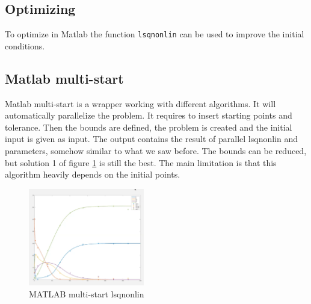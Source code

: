   \subsection{Optimizing}
  To optimize in Matlab the function \texttt{lsqnonlin} can be used to improve the initial conditions.

  \subsection{Matlab multi-start}
  Matlab multi-start is a wrapper working with different algorithms.
  It will automatically parallelize the problem.
  It requires to insert starting points and tolerance.
  Then the bounds are defined, the problem is created and the initial input is given as input.
  The output contains the result of parallel lsqnonlin and parameters, somehow similar to what we saw before.
  The bounds can be reduced, but solution 1 of figure \ref{fig:lsqnonlin} is still the best.
  The main limitation is that this algorithm heavily depends on the initial points.

  \begin{figure}[H]
    \centering
    \includegraphics[width=0.45\textwidth]{multistep.png}
    \caption{MATLAB multi-start lsqnonlin}
    \label{fig:lsqnonlin}
  \end{figure}
